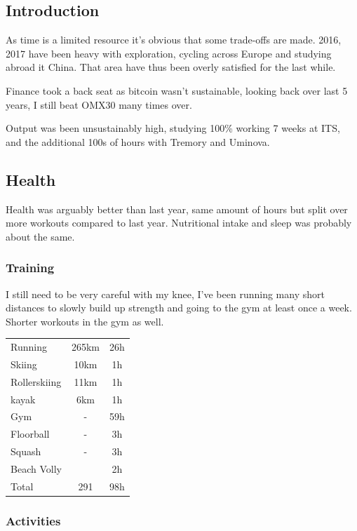 \documentclass[a4paper]{article}
\begin{document}
\subsection{Introduction}

As time is a limited resource it's obvious that some trade-offs are made. 2016, 2017 have been heavy with exploration, cycling across Europe and studying abroad it China. That area have thus been overly satisfied for the last while.

Finance took a back seat as bitcoin wasn't sustainable, looking back over last 5 years, I still beat OMX30 many times over.

Output was been unsustainably high, studying 100\% working 7 weeks at ITS, and the additional 100s of hours with Tremory and Uminova.

\subsection{Health}

Health was arguably better than last year, same amount of hours but split over more workouts compared to last year. Nutritional intake and sleep was probably about the same.
 
\subsubsection{Training}

I still need to be very careful with my knee, I've been running many short distances to slowly build up strength and going to the gym at least once a week. Shorter workouts in the gym as well.

\begin{tabular}{l|c|c}
Running & 265km & 26h\\
Skiing & 10km & 1h\\
Rollerskiing & 11km & 1h\\
kayak & 6km & 1h\\
Gym & - & 59h\\
Floorball & - & 3h\\
Squash & - & 3h\\
Beach Volly &  & 2h\\

Total & 291 & 98h

\end{tabular}

\subsubsection{Activities}
\end{document}
